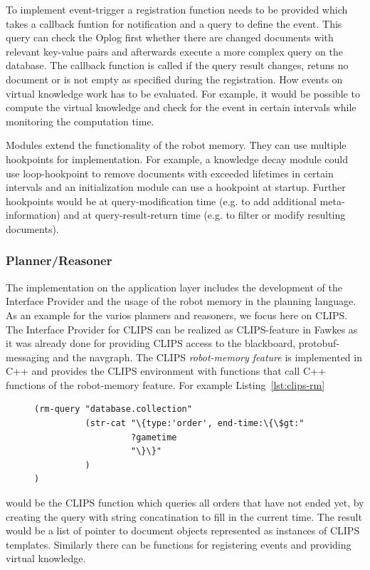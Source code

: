 \documentclass[a4paper,11pt]{article}
\newcommand{\reflst}[1]{Listing~\ref{#1}}
\begin{document}
To implement event-trigger a registration function needs to be
provided which takes a callback funtion for notification and a query
to define the event. This query can check the Oplog first whether
there are changed documents with relevant key-value pairs and
afterwards execute a more complex query on the database. The callback
function is called if the query result changes, retuns no document or
is not empty as specified during the registration. How events on
virtual knowledge work has to be evaluated. For example, it would be
possible to compute the virtual knowledge and check for the event in
certain intervals while monitoring the computation time.

Modules extend the functionality of the robot memory. They can use
multiple hookpoints for implementation. For example, a knowledge decay
module could use loop-hookpoint to remove documents with exceeded
lifetimes in certain intervals and an initialization module can use a
hookpoint at startup. Further hookpoints would be at
query-modification time (e.g. to add additional meta-information) and
at query-result-return time (e.g. to filter or modify resulting
documents).

\subsubsection{Planner/Reasoner}
\label{sec:impl-planner}
The implementation on the application layer includes the development
of the Interface Provider and the usage of the robot memory in the
planning language. As an example for the varios planners and
reasoners, we focus here on CLIPS. The Interface Provider for CLIPS
can be realized as CLIPS-feature in Fawkes as it was already done for
providing CLIPS access to the blackboard, protobuf-messaging and the
navgraph. The CLIPS \emph{robot-memory feature} is implemented in C++
and provides the CLIPS environment with functions that call C++
functions of the robot-memory feature. For example \reflst{lst:clips-rm}
\begin{figure}
  \begin{lstlisting}[showlines,style=ReallySmallCLIPS, caption={CLIPS funtion to execute a query},
  label=lst:clips-rm,
  emph={skill, args, state, target, res},
  emphstyle=\bfseries\color{green!80!black},
  emph={[2]\?skill, \$\?args, wait-for-lock, \?target, use,
  WAIT-FOR-LOCK, SKILL-EXECUTION, running},
  emphstyle={[2]\bfseries\color{blue!80!black}},
  morekeywords={retract, assert, modify, skill-call, skill-to-execute,
    wait-for-lock}]
(rm-query "database.collection"
          (str-cat "\{type:'order', end-time:\{\$gt:"
                   ?gametime
                   "\}\}"
          )
)
\end{lstlisting} %
\end{figure}
would be the CLIPS function which queries all orders that have not
ended yet, by creating the query with string concatination to fill in
the current time. The result would be a list of pointer to document
objects represented as instances of CLIPS templates. Similarly there
can be functions for registering events and providing virtual
knowledge.
\end{document}
